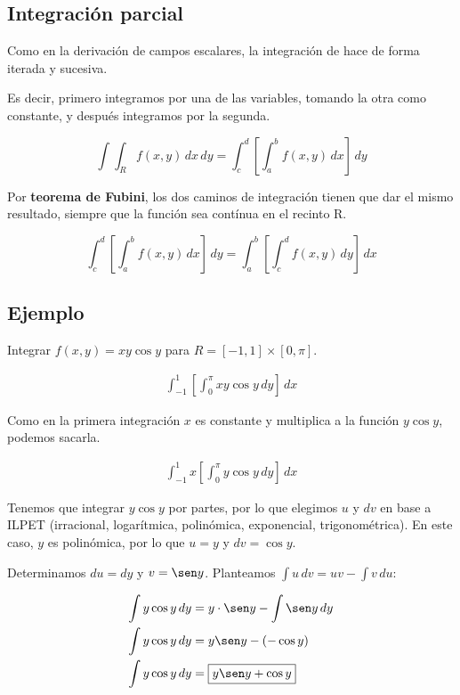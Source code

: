 \subsection{Integración parcial}

Como en la derivación de campos escalares,
la integración de hace de forma iterada y sucesiva.

Es decir, primero integramos por una de las variables, tomando la otra como constante, y después integramos por la segunda.

\begin{equation*}
    \int\int_R f(x,y) \,dx\,dy = \int_{c}^{d} \left[\int_{a}^{b} f(x,y) \,dx\right] \,dy
\end{equation*}

Por \textbf{teorema de Fubini},
los dos caminos de integración tienen que dar el mismo resultado,
siempre que la función sea contínua en el recinto R.

\begin{equation*}
    \int_{c}^{d} \left[\int_{a}^{b} f(x,y) \,dx\right] \,dy = \int_{a}^{b} \left[\int_{c}^{d} f(x,y) \,dy\right] \,dx
\end{equation*}

\subsection{Ejemplo}

Integrar \(f(x,y) = xy\cos y\) para \(R = [-1,1] \times [0,\pi] \).

\begin{align*}
    \int_{-1}^{1} \left[\int_{0}^{\pi} xy\cos y \,dy\right] \,dx
\end{align*}

Como en la primera integración \(x\) es constante y multiplica a la función \(y\cos y\), podemos sacarla.

\begin{align*}
    \int_{-1}^{1} x \left[\int_{0}^{\pi} y\cos y \,dy\right] \,dx
\end{align*}

Tenemos que integrar \(y\cos y\) por partes, por lo que elegimos \(u\) y \(dv\) en base a ILPET (irracional, logarítmica, polinómica, exponencial, trigonométrica).
En este caso, \(y\) es polinómica, por lo que \(u = y\) y \(dv = \cos y\).

Determinamos \(du = dy\) y \(v = \sen y\). Planteamos \(\int u\,dv = uv - \int v \,du\):

\begin{align*}
    \int y\cos y \,dy & = y \cdot \sen y - \int \sen y \,dy \\
    \int y\cos y \,dy & = y \sen y - (-\cos y) \\
    \int y\cos y \,dy & = \boxed{y \sen y + \cos y}
\end{align*}


